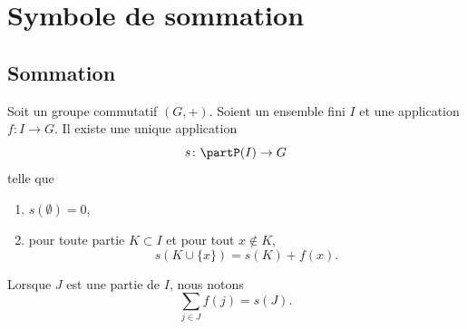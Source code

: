 \section{Symbole de sommation}

\subsection{Sommation}


\begin{propositionDef}	\label{PROPooDUSJooWNyqWm}
	Soit un groupe commutatif \( (G,+)\). Soient un ensemble fini \( I\) et une application \(f \colon I\to G  \). Il existe une unique application
	\begin{equation}
		s \colon \partP(I)\to G
	\end{equation}
	telle que
	\begin{enumerate}
		\item
		      \( s(\emptyset)=0\),
		\item
		      pour toute partie \( K\subset I\) et pour tout \( x\not\in K\),
		      \begin{equation}
			      s(K\cup\{ x \})=s(K)+f(x).
		      \end{equation}
	\end{enumerate}
	Lorsque \( J\) est une partie de \( I\), nous notons
	\begin{equation}		\label{EQooDVYXooEoNUiF}
		\sum_{j\in J}f(j)=s(J).
	\end{equation}
\end{propositionDef}

